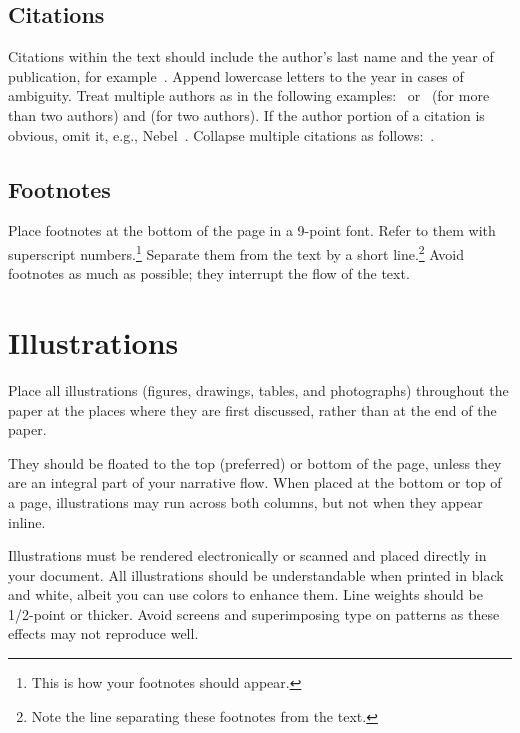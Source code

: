 \documentclass{article}
\begin{document}
\subsection{Citations}

Citations within the text should include the author's last name and
the year of publication, for example~\cite{gottlob:nonmon}.  Append
lowercase letters to the year in cases of ambiguity.  Treat multiple
authors as in the following examples:~\cite{abelson-et-al:scheme}
or~\cite{bgf:Lixto} (for more than two authors) and
\cite{brachman-schmolze:kl-one} (for two authors).  If the author
portion of a citation is obvious, omit it, e.g.,
Nebel~.  Collapse multiple citations as
follows:~\cite{gls:hypertrees,levesque:functional-foundations}.
\nocite{abelson-et-al:scheme}
\nocite{bgf:Lixto}
\nocite{brachman-schmolze:kl-one}
\nocite{gls:hypertrees}
\nocite{levesque:functional-foundations}
\nocite{levesque:belief}
\nocite{nebel:jair-2000}
~\cite{gls:hypertrees,levesque:functional-foundations}
\subsection{Footnotes}

Place footnotes at the bottom of the page in a 9-point font.  Refer to
them with superscript numbers.\footnote{This is how your footnotes
should appear.} Separate them from the text by a short
line.\footnote{Note the line separating these footnotes from the
text.} Avoid footnotes as much as possible; they interrupt the flow of
the text.

\section{Illustrations}

Place all illustrations (figures, drawings, tables, and photographs)
throughout the paper at the places where they are first discussed,
rather than at the end of the paper.

They should be floated to the top (preferred) or bottom of the page, 
unless they are an integral part 
of your narrative flow. When placed at the bottom or top of
a page, illustrations may run across both columns, but not when they
appear inline.

Illustrations must be rendered electronically or scanned and placed
directly in your document. All illustrations should be understandable when printed in black and
white, albeit you can use colors to enhance them. Line weights should
be 1/2-point or thicker. Avoid screens and superimposing type on
patterns as these effects may not reproduce well.
\end{document}
